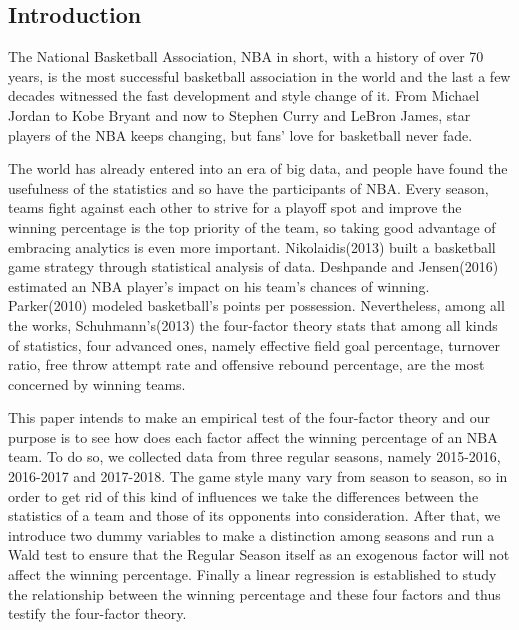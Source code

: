 \documentclass[12pt, a4paper]{article}
\begin{document}
\begin{spacing}{1.5}
\section{Introduction}
The National Basketball Association, NBA in short, with a history of over 70 years, is the most successful basketball association in the world and the last a few decades witnessed the fast development and style change of it. From Michael Jordan to Kobe Bryant and now to Stephen Curry and LeBron James, star players of the NBA keeps changing, but fans' love for basketball never fade.%
\par
The world has already entered into an era of big data, and people have found the usefulness of the statistics and so have the participants of NBA. Every season, teams fight against each other to strive for a playoff spot and improve the winning percentage is the top priority of the team, so taking good advantage of embracing analytics is even more important. Nikolaidis(2013) built a basketball game strategy through statistical analysis of data\cite{YN}. Deshpande and Jensen(2016) estimated an NBA player’s impact on his team’s chances of winning\cite{SK}. Parker(2010) modeled basketball’s points per possession\cite{RJP}. Nevertheless, among all the works,  Schuhmann’s(2013) the four-factor theory stats that among all kinds of statistics, four advanced ones, namely effective field goal percentage, turnover ratio, free throw attempt rate and offensive rebound percentage, are the most concerned by winning teams\cite{JS}. 
\par
This paper intends to make an empirical test of the four-factor theory and our purpose is to see how does each factor affect the winning percentage of an NBA team. To do so, we collected data from three regular seasons, namely 2015-2016, 2016-2017 and 2017-2018. The game style many vary from season to season, so in order to get rid of this kind of influences we take the differences between the statistics of a team and those of its opponents into consideration. After that, we introduce two dummy variables to make a distinction among seasons and run a Wald test to ensure that the Regular Season itself as an exogenous factor will not affect the winning percentage. Finally a linear regression is established to study the relationship between the winning percentage and these four factors and thus testify the four-factor theory.
\newpage

\end{spacing}
\end{document}

